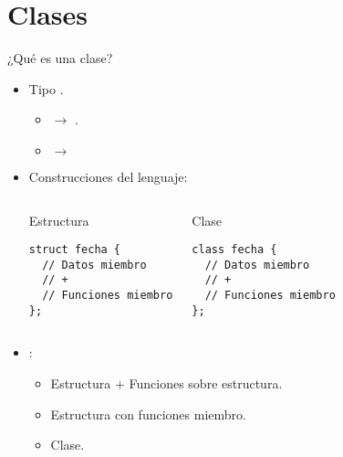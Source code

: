 \section{Clases}

\begin{frame}[t,fragile]{¿Qué es una clase?}
\begin{itemize}
  \item Tipo .
    \begin{itemize}
      \item {} $\rightarrow$ .
      \item {} $\rightarrow$ 
    \end{itemize}

  \item Construcciones del lenguaje:

\begin{columns}[T]

\begin{block}{Estructura}
\begin{lstlisting}
struct fecha {
  // Datos miembro
  // +
  // Funciones miembro
};
\end{lstlisting}
\end{block}

\begin{block}{Clase}
\begin{lstlisting}
class fecha {
  // Datos miembro
  // +
  // Funciones miembro
};
\end{lstlisting}
\end{block}


\end{columns}

  \item {}:
    \begin{itemize}
      \item Estructura + Funciones sobre estructura.
      \item Estructura con funciones miembro.
      \item Clase.    
    \end{itemize}
\end{itemize}
\end{frame}


